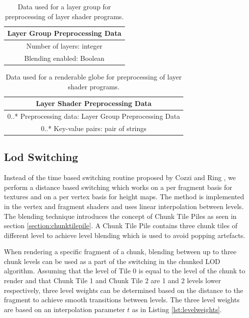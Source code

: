 \begin{table}
\centering 
\caption[]{Data used for a layer group for preprocessing of layer shader programs.}
\label{table:layergrouppreprocessingdata}
\begin{tabular}{ c }    
    	\hline
        \textbf{Layer Group Preprocessing Data} \\ 
    	\hline
	Number of layers: integer \\
    	Blending enabled: Boolean \\
	\hline
\end{tabular}
\end{table}

\begin{table}
\centering
\caption[]{Data used for a renderable globe for preprocessing of layer shader programs.}
\label{table:layergrouppreprocessingdata}
\begin{tabular}{ c }
    
    	\hline
        \textbf{Layer Shader Preprocessing Data} \\ 
    	\hline
	0..* Preprocessing data: Layer Group Preprocessing Data \\
    	0..* Key-value pairs: pair of strings \\
    	\hline
    
\end{tabular}
\end{table}

\subsection{Lod Switching}

Instead of the time based switching routine proposed by Cozzi and Ring \cite{cozzi11}, we perform a distance based switching which works on a per fragment basis for textures and on a per vertex basis for height maps. The method is implemented in the vertex and fragment shaders and uses linear interpolation between levels. The blending technique introduces the concept of Chunk Tile Piles as seen in section \ref{section:chunktilepile}. A Chunk Tile Pile contains three chunk tiles of different level to achieve level blending which is used to avoid popping artefacts. 

When rendering a specific fragment of a chunk, blending between up to three chunk levels can be used as a part of the switching in the chunked LOD algorithm. Assuming that the level of Tile 0 is equal to the level of the chunk to render and that Chunk Tile 1 and Chunk Tile 2 are 1 and 2 levels lower respectively, three level weights can be determined based on the distance to the fragment to achieve smooth transitions between levels. The three level weights are based on an interpolation parameter $t$ as in Listing \ref{lst:levelweights}.

